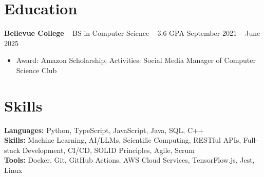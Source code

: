 \documentclass[11pt]{article}       %
\begin{document}

\vspace{-18.5pt}

\section*{Education}
\textbf{Bellevue College} -- BS in Computer Science -- 3.6 GPA \hfill September 2021 -- June 2025\\
\vspace{-9pt}
\begin{itemize}
  \item Award: Amazon Scholarship, Activities: Social Media Manager of Computer Science Club
\end{itemize}

\vspace{-18.5pt}

\section*{Skills}
\textbf{Languages:} Python, TypeScript, JavaScript, Java, SQL, C++\\
\textbf{Skills:} Machine Learning, AI/LLMs, Scientific Computing, RESTful APIs, Full-stack Development, CI/CD, SOLID Principles, Agile, Scrum\\
\textbf{Tools:} Docker, Git, GitHub Actions, AWS Cloud Services, TensorFlow.js, Jest, Linux

\vspace{-6.5pt}
\end{document}
